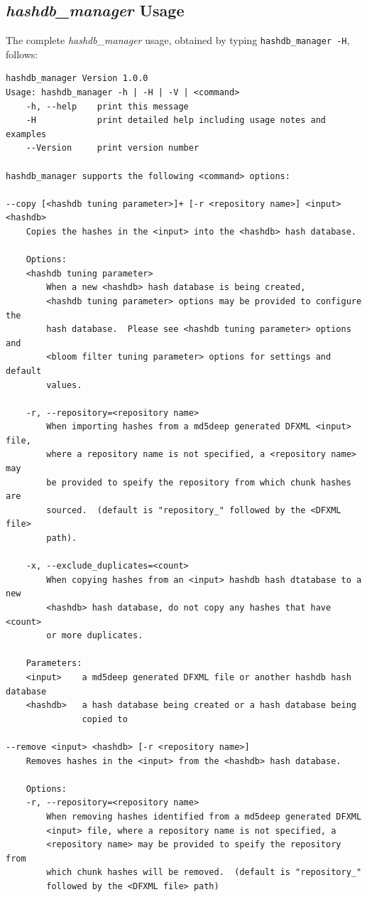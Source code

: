 \documentclass[11pt,twoside]{article}
\newcommand \hdbm {\textit{hashdb\_manager}\xspace}
\begin{document}
\subsection{\hdbm Usage\label{hdbm-usage}}
The complete \hdbm usage,
obtained by typing \texttt{hashdb\_manager -H}, follows:
\begin{small}
\begin{verbatim}
hashdb_manager Version 1.0.0
Usage: hashdb_manager -h | -H | -V | <command>
    -h, --help    print this message
    -H            print detailed help including usage notes and examples
    --Version     print version number

hashdb_manager supports the following <command> options:

--copy [<hashdb tuning parameter>]+ [-r <repository name>] <input> <hashdb>
    Copies the hashes in the <input> into the <hashdb> hash database.

    Options:
    <hashdb tuning parameter>
        When a new <hashdb> hash database is being created,
        <hashdb tuning parameter> options may be provided to configure the
        hash database.  Please see <hashdb tuning parameter> options and
        <bloom filter tuning parameter> options for settings and default
        values.

    -r, --repository=<repository name>
        When importing hashes from a md5deep generated DFXML <input> file,
        where a repository name is not specified, a <repository name> may
        be provided to speify the repository from which chunk hashes are
        sourced.  (default is "repository_" followed by the <DFXML file>
        path).

    -x, --exclude_duplicates=<count>
        When copying hashes from an <input> hashdb hash dtatabase to a new
        <hashdb> hash database, do not copy any hashes that have <count>
        or more duplicates.

    Parameters:
    <input>    a md5deep generated DFXML file or another hashdb hash database
    <hashdb>   a hash database being created or a hash database being
               copied to

--remove <input> <hashdb> [-r <repository name>]
    Removes hashes in the <input> from the <hashdb> hash database.

    Options:
    -r, --repository=<repository name>
        When removing hashes identified from a md5deep generated DFXML
        <input> file, where a repository name is not specified, a
        <repository name> may be provided to speify the repository from
        which chunk hashes will be removed.  (default is "repository_"
        followed by the <DFXML file> path)


\end{verbatim}
\end{small}
\end{document}
